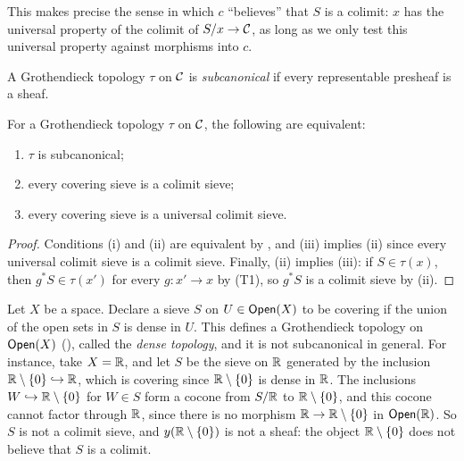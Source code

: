 This makes precise the sense in which $c$ ``believes'' that $S$ is a colimit: $x$ has the universal property of the colimit of $S/x \to \mathcal{C}$, as long as we only test this universal property against morphisms into $c$.

\begin{definition}\label{def:chap:sheaves:sec:sites:subcanonical}
    A Grothendieck topology $\tau$ on $\mathcal{C}$ is \emph{subcanonical} if every representable presheaf is a sheaf.
\end{definition}

\begin{corollary}\label{cor:chap:sheaves:sec:sites:subcanonical iff colimit sieves}
    For a Grothendieck topology $\tau$ on $\mathcal{C}$, the following are equivalent:
    \begin{enumerate}[label=(\roman*)]
        \item $\tau$ is subcanonical;
        \item every covering sieve is a colimit sieve;
        \item every covering sieve is a universal colimit sieve.
    \end{enumerate}
\end{corollary}
\begin{proof}
    Conditions (i) and (ii) are equivalent by , and (iii) implies (ii) since every universal colimit sieve is a colimit sieve. Finally, (ii) implies (iii): if $S \in \tau(x)$, then $g^* S \in \tau(x')$ for every $g : x' \to x$ by (T1), so $g^* S$ is a colimit sieve by (ii).
\end{proof}

\begin{example}\label{example:chap:sheaves:sec:sites:dense topology}
    Let $X$ be a space. Declare a sieve $S$ on $U \in \mathsf{Open}(X)$ to be covering if the union of the open sets in $S$ is dense in $U$. This defines a Grothendieck topology on $\mathsf{Open}(X)$ (), called the \emph{dense topology}, and it is not subcanonical in general. For instance, take $X = \mathbb{R}$, and let $S$ be the sieve on $\mathbb{R}$ generated by the inclusion $\mathbb{R} \setminus \{0\} \hookrightarrow \mathbb{R}$, which is covering since $\mathbb{R} \setminus \{0\}$ is dense in $\mathbb{R}$. The inclusions $W \hookrightarrow \mathbb{R} \setminus \{0\}$ for $W \in S$ form a cocone from $S/\mathbb{R}$ to $\mathbb{R} \setminus \{0\}$, and this cocone cannot factor through $\mathbb{R}$, since there is no morphism $\mathbb{R} \to \mathbb{R} \setminus \{0\}$ in $\mathsf{Open}(\mathbb{R})$. So $S$ is not a colimit sieve, and $y(\mathbb{R} \setminus \{0\})$ is not a sheaf: the object $\mathbb{R} \setminus \{0\}$ does not believe that $S$ is a colimit.
\end{example}

